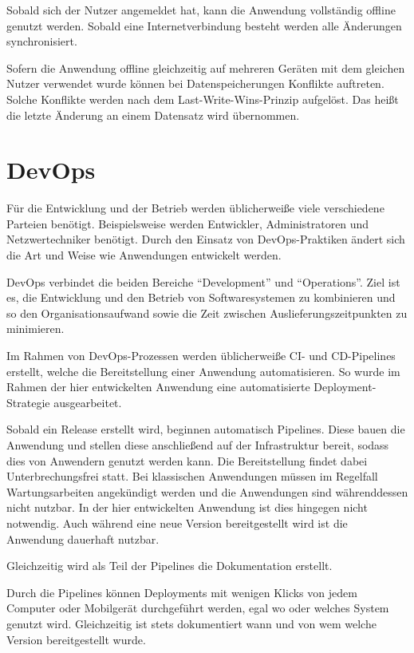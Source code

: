 Sobald sich der Nutzer angemeldet hat, kann die Anwendung vollständig offline genutzt werden.
Sobald eine Internetverbindung besteht werden alle Änderungen synchronisiert.

Sofern die Anwendung offline gleichzeitig auf mehreren Geräten mit dem gleichen Nutzer verwendet wurde können bei Datenspeicherungen Konflikte auftreten.
Solche Konflikte werden nach dem Last-Write-Wins-Prinzip aufgelöst.
Das heißt die letzte Änderung an einem Datensatz wird übernommen.


\section{DevOps}
Für die Entwicklung und der Betrieb werden üblicherweiße viele verschiedene Parteien benötigt.
Beispielsweise werden Entwickler, Administratoren und Netzwertechniker benötigt.
Durch den Einsatz von DevOps-Praktiken ändert sich die Art und Weise wie Anwendungen entwickelt werden.

DevOps verbindet die beiden Bereiche \enquote{Development} und \enquote{Operations}.
Ziel ist es, die Entwicklung und den Betrieb von Softwaresystemen zu kombinieren und so den Organisationsaufwand sowie die Zeit zwischen Auslieferungszeitpunkten zu minimieren.\autocite[][S. 156]{Artac2018}

Im Rahmen von DevOps-Prozessen werden üblicherweiße \ac{CI}- und \ac{CD}-Pipelines erstellt, welche die Bereitstellung einer Anwendung automatisieren.
So wurde im Rahmen der hier entwickelten Anwendung eine automatisierte Deployment-Strategie ausgearbeitet.

Sobald ein Release erstellt wird, beginnen automatisch Pipelines.
Diese bauen die Anwendung und stellen diese anschließend auf der Infrastruktur bereit, sodass dies von Anwendern genutzt werden kann.
Die Bereitstellung findet dabei Unterbrechungsfrei statt.
Bei klassischen Anwendungen müssen im Regelfall Wartungsarbeiten angekündigt werden und die Anwendungen sind währenddessen nicht nutzbar.
In der hier entwickelten Anwendung ist dies hingegen nicht notwendig.
Auch während eine neue Version bereitgestellt wird ist die Anwendung dauerhaft nutzbar.

Gleichzeitig wird als Teil der Pipelines die Dokumentation erstellt.

Durch die Pipelines können Deployments mit wenigen Klicks von jedem Computer oder Mobilgerät durchgeführt werden, egal wo oder welches System genutzt wird.
Gleichzeitig ist stets dokumentiert wann und von wem welche Version bereitgestellt wurde.


